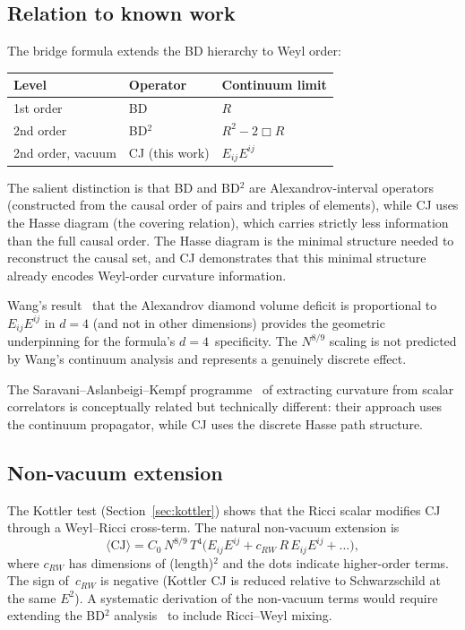 \documentclass[12pt,a4paper]{article}
\theoremstyle{plain}
\theoremstyle{definition}
\theoremstyle{remark}
\newcommand{\Esq}{E_{ij}E^{ij}}
\newcommand{\CJ}{\mathrm{CJ}}
\begin{document}
\subsection{Relation to known work}

The bridge formula extends the BD hierarchy to Weyl order:
\begin{center}
\begin{tabular}{lll}
\toprule
Level & Operator & Continuum limit \\
\midrule
1st order & BD~\cite{BenincasaDowker:2010} & $R$ \\
2nd order & BD${}^2$~\cite{deBrito:2023} & $R^2 - 2\Box R$ \\
2nd order, vacuum & CJ (this work) & $\Esq$ \\
\bottomrule
\end{tabular}
\end{center}

The salient distinction is that BD and BD${}^2$ are
Alexandrov-interval operators (constructed from the causal order
of pairs and triples of elements), while CJ uses the Hasse diagram
(the covering relation), which carries strictly less information
than the full causal order.  The Hasse diagram is the minimal
structure needed to reconstruct the causal set, and CJ
demonstrates that this minimal structure already encodes
Weyl-order curvature information.

Wang's result~\cite{Wang:2019} that the Alexandrov diamond volume
deficit is proportional to~$\Esq$ in $d = 4$ (and not in other
dimensions) provides the geometric underpinning for the formula's
$d = 4$~specificity.  The $N^{8/9}$ scaling is not predicted by
Wang's continuum analysis and represents a genuinely discrete
effect.

The Saravani--Aslanbeigi--Kempf
programme~\cite{Saravani:2014} of extracting curvature from
scalar correlators is conceptually related but technically
different: their approach uses the continuum propagator, while CJ
uses the discrete Hasse path structure.

\subsection{Non-vacuum extension}

The Kottler test (Section~\ref{sec:kottler}) shows that the Ricci
scalar modifies CJ through a Weyl--Ricci cross-term.  The natural
non-vacuum extension is
\begin{equation}\label{eq:non-vacuum}
  \langle \CJ \rangle = C_0\, N^{8/9}\, T^4
  \bigl(\Esq + c_{RW}\, R\, \Esq + \ldots\bigr),
\end{equation}
where $c_{RW}$ has dimensions of (length)${}^2$ and the dots
indicate higher-order terms.  The sign of~$c_{RW}$ is negative
(Kottler CJ is reduced relative to Schwarzschild at the same $E^2$).
A systematic derivation of the non-vacuum terms would require
extending the BD${}^2$ analysis~\cite{deBrito:2023} to include
Ricci--Weyl mixing.
\end{document}
